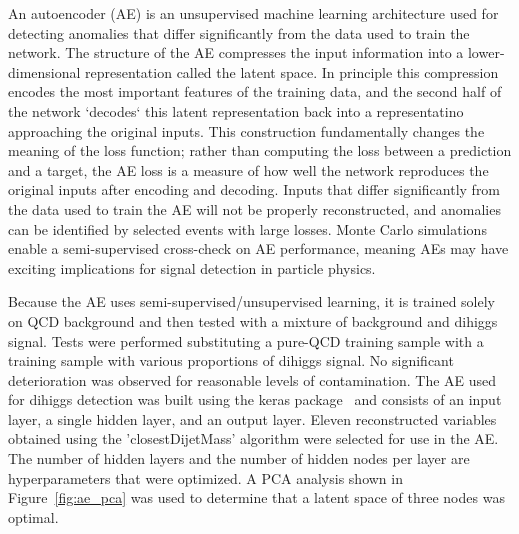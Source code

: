 \label{sec:AE}

An autoencoder (AE) is an unsupervised machine learning architecture used for detecting anomalies that differ significantly from the data used to train the network. The structure of the AE compresses the input information into a lower-dimensional representation called the latent space. In principle this compression encodes the most important features of the training data, and the second half of the network `decodes` this latent representation back into a representatino approaching the original inputs. This construction fundamentally changes the meaning of the loss function; rather than computing the loss between a prediction and a target, the AE loss is a measure of how well the network reproduces the original inputs after encoding and decoding. Inputs that differ significantly from the data used to train the AE will not be properly reconstructed, and anomalies can be identified by selected events with large losses. Monte Carlo simulations enable a semi-supervised cross-check on AE performance, meaning AEs may have exciting implications for signal detection in particle physics.

Because the AE uses semi-supervised/unsupervised learning, it is trained solely on QCD background and then tested with a mixture of background and dihiggs signal. Tests were performed substituting a pure-QCD training sample with a training sample with various proportions of dihiggs signal. No significant deterioration was observed for reasonable levels of contamination. The AE used for dihiggs detection was built using the keras package~\cite{chollet2015keras} and consists of an input layer, a single hidden layer, and an output layer. Eleven reconstructed variables obtained using the 'closestDijetMass' algorithm were selected for use in the AE. The number of hidden layers and the number of hidden nodes per layer are hyperparameters that were optimized. A PCA analysis shown in Figure~\ref{fig:ae_pca} was used to determine that a latent space of three nodes was optimal.

